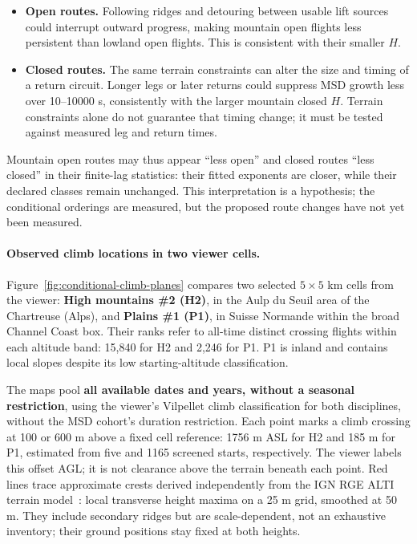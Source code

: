 \begin{itemize}
 \item \textbf{Open routes.} Following ridges and detouring between usable
 lift sources could interrupt outward progress, making mountain open
 flights less persistent than lowland open flights. This is consistent
 with their smaller $H$.
 \item \textbf{Closed routes.} The same terrain constraints can alter the
 size and timing of a return circuit. Longer legs or later returns could
 suppress MSD growth less over 10--10000 s, consistently with the larger
 mountain closed $H$. Terrain constraints alone do not guarantee that
 timing change; it must be tested against measured leg and return times.
\end{itemize}
Mountain open routes may thus appear ``less open'' and closed routes
``less closed'' in their finite-lag statistics: their fitted exponents are
closer, while their declared classes remain unchanged. This interpretation
is a hypothesis; the conditional orderings are measured, but the proposed
route changes have not yet been measured.

\paragraph{Observed climb locations in two viewer cells.}
Figure~\ref{fig:conditional-climb-planes} compares two selected
$5\times5$ km cells from the viewer: \textbf{High mountains \#2 (H2)}, in
the Aulp du Seuil area of the Chartreuse (Alps), and \textbf{Plains \#1 (P1)},
in Suisse Normande within the broad Channel Coast box. Their ranks refer to
all-time distinct crossing flights within each altitude band: 15,840 for H2
and 2,246 for P1.
P1 is inland and contains local slopes despite its low starting-altitude
classification.

The maps pool \textbf{all available dates and years, without a seasonal
restriction}, using the viewer's Vilpellet climb classification for both
disciplines, without the MSD cohort's duration restriction.
Each point marks a climb crossing at 100 or 600 m above a fixed cell
reference: 1756 m ASL for H2 and 185 m for P1, estimated from five and 1165
screened starts, respectively. The viewer labels this offset AGL; it is not
clearance above the terrain beneath each point.
Red lines trace approximate crests derived independently from the IGN RGE ALTI
terrain model~\cite{ign_rge_alti}: local transverse height maxima on a 25 m
grid, smoothed at 50 m. They include secondary ridges but are scale-dependent,
not an exhaustive inventory; their ground positions stay fixed at both heights.

